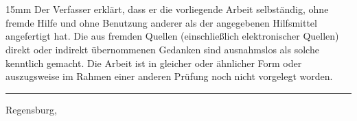 \documentclass[numbers=noenddot, a4paper, 12pt]{scrreprt}
\begin{document}
\begingroup
\let\cleardoublepage\relax
\let\clearpage\relax
\newpage
\chapter{\listfigurename}
\renewcommand{\chapter}[2]{}%
\listoffigures
\endgroup

\restoregeometry
\chapter{Eigenständigkeitserklärung}
\vspace{15mm} 
Der Verfasser erklärt, dass er die vorliegende Arbeit selbständig, ohne fremde Hilfe und ohne Benutzung anderer als der angegebenen Hilfsmittel angefertigt hat. Die aus fremden Quellen (einschließlich elektronischer Quellen) direkt oder indirekt übernommenen Gedanken sind ausnahmslos als solche kenntlich gemacht. Die Arbeit ist in gleicher oder ähnlicher Form oder auszugsweise im Rahmen einer anderen Prüfung noch nicht vorgelegt worden.


\vspace{20mm}
\hrule
\vspace{5mm}
Regensburg, \date{\today}
 
\vspace{5cm}
\end{document}
